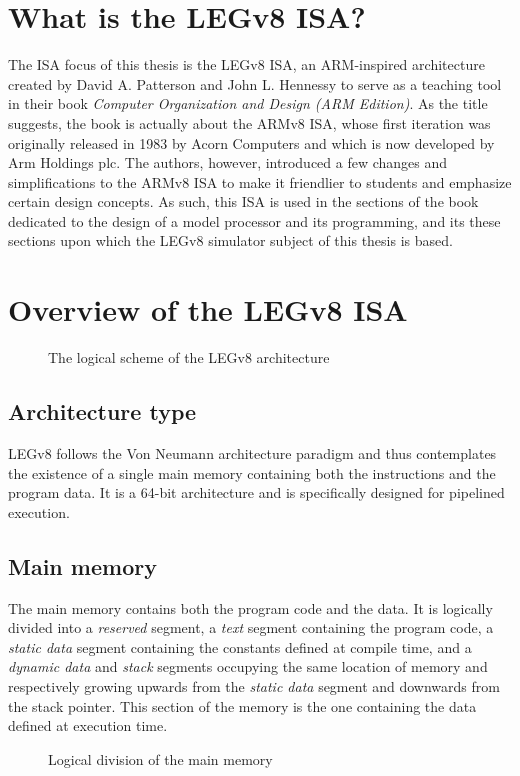 \section*{What is the LEGv8 ISA?}

The ISA focus of this thesis is the LEGv8 ISA, an ARM-inspired architecture created by David A. Patterson and John L. Hennessy to serve as a teaching
tool in their book \emph{Computer Organization and Design (ARM Edition)}. As the title suggests, the book is actually about the ARMv8 ISA, whose first
iteration was originally released in 1983 by Acorn Computers and which is now developed by Arm Holdings plc. The authors, however, introduced a few
changes and simplifications to the ARMv8 ISA to make it friendlier to students and emphasize certain design concepts. As such, this ISA is used
in the sections of the book dedicated to the design of a model processor and its programming, and its these sections upon which the LEGv8 simulator
subject of this thesis is based.

\section*{Overview of the LEGv8 ISA}

\begin{figure}[h!]\label{fig:example}
	\centering
	\caption{The logical scheme of the LEGv8 architecture}
\end{figure}

\subsection*{Architecture type}
LEGv8 follows the Von Neumann architecture paradigm and thus contemplates the existence of a single main memory containing both the instructions and the program data. It is a 64-bit architecture and is specifically designed for pipelined execution. 
\subsection*{Main memory}
The main memory contains both the program code and the data. It is logically divided into a \emph{reserved} segment, a \emph{text} segment containing the program code, a \emph{static data} segment containing the constants defined at compile time, and a \emph{dynamic data} and \emph{stack} segments occupying the same location of memory and respectively growing upwards from the \emph{static data} segment and downwards from the stack pointer. This section of the memory is the one containing the data defined at execution time.
\begin{figure}[h!]\label{fig:example}
	\centering
	\caption{Logical division of the main memory}
\end{figure}
